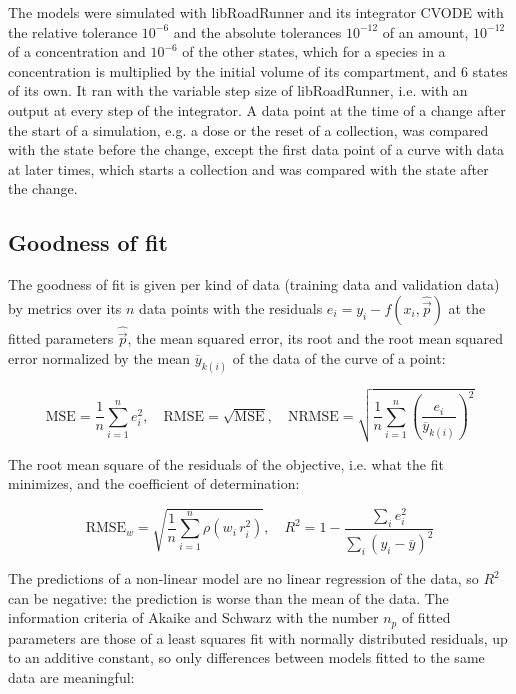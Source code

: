 \documentclass{article}
\begin{document}
The models were simulated with libRoadRunner \cite{Welsh2023} and its integrator CVODE \cite{Hindmarsh2005} with the relative tolerance $10^{-6}$ and the absolute tolerances $10^{-12}$ of an amount, $10^{-12}$ of a concentration and $10^{-6}$ of the other states, which for a species in a concentration is multiplied by the initial volume of its compartment, and 6 states of its own. It ran with the variable step size of libRoadRunner, i.e. with an output at every step of the integrator. A data point at the time of a change after the start of a simulation, e.g. a dose or the reset of a collection, was compared with the state before the change, except the first data point of a curve with data at later times, which starts a collection and was compared with the state after the change.

\subsection{Goodness of fit}

The goodness of fit is given per kind of data (training data and validation data) by metrics over its $n$ data points with the residuals $e_i = y_i - f(x_i, \hat{\vec{p}})$ at the fitted parameters $\hat{\vec{p}}$, the mean squared error, its root and the root mean squared error normalized by the mean $\overline{y}_{k(i)}$ of the data of the curve of a point:

\begin{equation}
\mathrm{MSE} = \frac{1}{n} \sum_{i=1}^{n} e_i^2, \quad \mathrm{RMSE} = \sqrt{\mathrm{MSE}}, \quad \mathrm{NRMSE} = \sqrt{\frac{1}{n} \sum_{i=1}^{n} \left(\frac{e_i}{\overline{y}_{k(i)}}\right)^2}
\end{equation}

The root mean square of the residuals of the objective, i.e. what the fit minimizes, and the coefficient of determination:

\begin{equation}
\mathrm{RMSE}_w = \sqrt{\frac{1}{n} \sum_{i=1}^{n} \rho\left(w_i\, r_i^2\right)}, \quad R^2 = 1 - \frac{\sum_{i} e_i^2}{\sum_{i} \left(y_i - \overline{y}\right)^2}
\end{equation}

The predictions of a non-linear model are no linear regression of the data, so $R^2$ can be negative: the prediction is worse than the mean of the data. The information criteria of Akaike \cite{Akaike1974} and Schwarz \cite{Schwarz1978} with the number $n_p$ of fitted parameters are those of a least squares fit with normally distributed residuals, up to an additive constant, so only differences between models fitted to the same data are meaningful:
\end{document}
